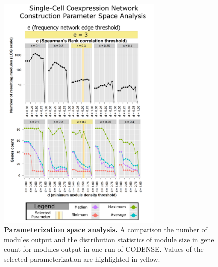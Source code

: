 \documentclass[10pt,letterpaper]{article}
\begin{document}
\begin{figure}[t]
\centering
\includegraphics[width=80mm]{Figures/ParameterSpaceE=3}
\caption{\textbf{Parameterization space analysis.} A comparison the number of modules output and the distribution statistics of module size in gene count for modules output in one run of CODENSE. Values of the selected parameterization are highlighted in yellow.}
\label{Parameter Space Figure}
\end{figure}
\end{document}
